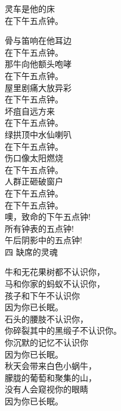 \documentclass{article}
\begin{document}
\begin{center}
\begin{minipage}{0.5\linewidth}
灵车是他的床 \\
在下午五点钟。 \\

\end{minipage}

\newpage

\begin{minipage}{0.5\linewidth}

\Large

骨与笛响在他耳边 \\
在下午五点钟。 \\
那牛向他额头咆哮 \\
在下午五点钟。 \\
屋里剧痛大放异彩 \\
在下午五点钟。 \\
坏疽自远方来 \\
在下午五点钟。 \\
绿拱顶中水仙喇叭 \\
在下午五点钟。 \\
伤口像太阳燃烧 \\
在下午五点钟。 \\
人群正砸破窗户 \\
在下午五点钟。 \\
在下午五点钟。 \\
噢，致命的下午五点钟! \\
所有钟表的五点钟! \\
午后阴影中的五点钟! \\

四 缺席的灵魂 \\


\end{minipage}

\newpage

\begin{minipage}{0.5\linewidth}

\Large

牛和无花果树都不认识你， \\
马和你家的蚂蚁不认识你， \\
孩子和下午不认识你 \\
因为你已长眠。 \\

石头的腰肢不认识你， \\
你碎裂其中的黑缎子不认识你。 \\
你沉默的记忆不认识你 \\
因为你已长眠。 \\

秋天会带来白色小蜗牛， \\
朦胧的葡萄和聚集的山， \\
没有人会窥视你的眼睛 \\
因为你已长眠。 \\


\end{minipage}
\end{center}
\end{document}
